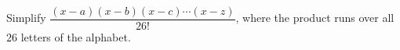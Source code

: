 Simplify $\dfrac{(x-a)(x-b)(x-c)\cdots(x-z)}{26!}$, where the product runs over all $26$ letters of the alphabet.
